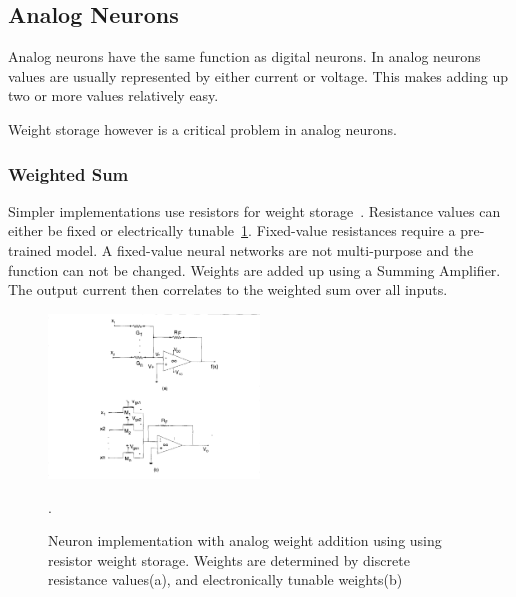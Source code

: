 \documentclass[conference]{IEEEtran}
\begin{document}



    \subsection{Analog Neurons}

    Analog neurons have the same function as digital neurons.
    In analog neurons values are usually represented by either current or voltage.
    This makes adding up two or more values relatively easy.

    Weight storage however is a critical problem in analog neurons.

    \subsubsection{Weighted Sum}

    Simpler implementations use resistors for weight storage~\cite{zurada1992analog}.
    Resistance values can either be fixed or electrically tunable~\ref{fig:analogweights}.
    Fixed-value resistances require a pre-trained model.
    A fixed-value neural networks are not multi-purpose and the function can not be changed.
    Weights are added up using a Summing Amplifier.
    The output current then correlates to the weighted sum over all inputs.

    \begin{figure}[h]
        \centering
        \includegraphics[width=0.5\textwidth]{resources/analog-weights.png}
        \caption{Neuron implementation with analog weight addition using using resistor weight storage.
        Weights are determined by discrete resistance values(a), and electronically tunable weights(b)~\cite[Fig.~1]{zurada1992analog}}.
        \label{fig:analogweights}
    \end{figure}
\end{document}
